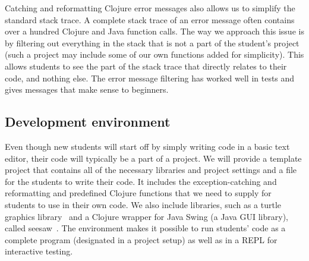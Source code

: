 \documentclass[submission,copyright,creativecommons]{eptcs}
\newcommand{\allcomments}[1]{{#1}}
\newcommand{\elenacomment}[1]{{\bf \textcolor{ForestGreen}{\allcomments{{#1}}}}}
\newcommand{\stephencomment}[1]{{\bf \color{StephensBlue}{\allcomments{{#1}}}}} %
\newcommand{\joecomment}[1]{{\bf \color{JoesGold}{\allcomments{{#1}}}}}
\newcommand{\todo}[1]{{\bf \color{magenta}{\allcomments{ To-do: {#1}}}}}
\begin{document}
Catching and reformatting Clojure error messages also allows us to simplify the standard stack trace. A complete stack trace of an error message often contains over a hundred Clojure and Java function calls. The way we approach this issue is by filtering out everything in the stack that is not a part of the student's project (such a project may include some of our own functions added for simplicity). This allows students to see the part of the stack trace that directly relates to their code, and nothing else. 
The error message filtering has worked well in tests and gives messages that make sense to beginners. %

\subsection{Development environment}\label{subsec:envt}
Even though new students will start off by simply writing code in a basic text editor, their code will typically be a part of a project.
We will provide a template project that contains all of the necessary libraries and project settings and %
a file for the students to write their code. It includes the exception-catching and reformatting and predefined Clojure functions that we need to supply for students to use in their own code. We also include libraries, such as a turtle graphics library~\cite{turtle} and a Clojure wrapper for Java Swing (a Java GUI library), called seesaw~\cite{graphics}. The environment makes it possible to run students' code as a complete program (designated in a project setup) as well as in a REPL %
for interactive testing. 
\end{document}
